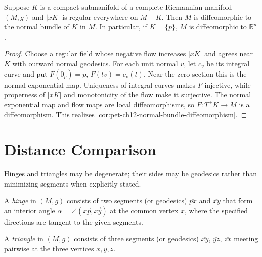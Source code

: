 \begin{corollary}
  \label{cor:pet-ch12-normal-bundle-diffeomorphism}

  Suppose $K$ is a compact submanifold of a complete Riemannian manifold $(M,g)$
  and $|xK|$ is regular everywhere on $M-K$. Then $M$ is diffeomorphic to the
  normal bundle of $K$ in $M$. In particular, if $K=\{p\}$, $M$ is diffeomorphic
  to $\mathbb{R}^n$.
\end{corollary}
\begin{proof}
  \sketch
  Choose a regular field whose negative flow increases $|xK|$ and agrees near
  $K$ with outward normal geodesics. For each unit normal $v$, let $c_v$ be its
  integral curve and put $F(0_p)=p$, $F(tv)=c_v(t)$. Near the zero section this
  is the normal exponential map. Uniqueness of integral curves makes $F$
  injective, while properness of $|xK|$ and monotonicity of the flow make it
  surjective. The normal exponential map and flow maps are local
  diffeomorphisms, so $F:T^+K\to M$ is a diffeomorphism.
  This realizes \cref{cor:pet-ch12-normal-bundle-diffeomorphism}.
\end{proof}

\section{Distance Comparison}

Hinges and triangles may be degenerate; their sides may be geodesics rather
than minimizing segments when explicitly stated.

\begin{definition}[hinge]
  \label{def:pet-ch12-hinge}

  A \emph{hinge} in $(M,g)$ consists of two segments (or geodesics)
  $\overline{px}$ and $\overline{xy}$ that form an interior angle
  $\alpha=\angle(\overrightarrow{xp},\overrightarrow{xy})$ at the common vertex
  $x$, where the specified directions are tangent to the given segments.
\end{definition}

\begin{definition}[triangle]
  \label{def:pet-ch12-triangle}

  A \emph{triangle} in $(M,g)$ consists of three segments (or geodesics)
  $\overline{xy}$, $\overline{yz}$, $\overline{zx}$ meeting pairwise at the three
  vertices $x,y,z$.
\end{definition}

